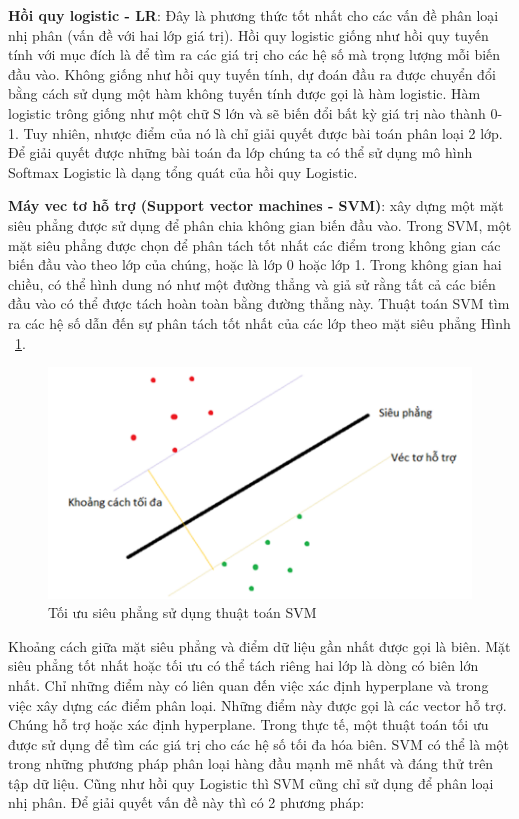 \textbf{Hồi quy logistic - LR}: Đây là phương thức tốt nhất cho các vấn đề phân loại nhị phân (vấn đề với hai lớp giá trị). Hồi quy logistic giống như hồi quy tuyến tính với mục đích là để tìm ra các giá trị cho các hệ số mà trọng lượng mỗi biến đầu vào. Không giống như hồi quy tuyến tính, dự đoán đầu ra được chuyển đổi bằng cách sử dụng một hàm không tuyến tính được gọi là hàm logistic. Hàm logistic trông giống như một chữ S lớn và sẽ biến đổi bất kỳ giá trị nào thành 0-1. Tuy nhiên, nhược điểm của nó là chỉ giải quyết được bài toán phân loại 2 lớp. Để giải quyết được những bài toán đa lớp chúng ta có thể sử dụng mô hình Softmax Logistic là dạng tổng quát của hồi quy Logistic.

\textbf{Máy vec tơ hỗ trợ (Support vector machines - SVM)}: xây dựng một mặt siêu phẳng được sử dụng để phân chia không gian biến đầu vào. Trong SVM, một mặt siêu phẳng được chọn để phân tách tốt nhất các điểm trong không gian các biến đầu vào theo lớp của chúng, hoặc là lớp 0 hoặc lớp 1. Trong không gian hai chiều, có thể hình dung nó như một đường thẳng và giả sử rằng tất cả các biến đầu vào có thể được tách hoàn toàn bằng đường thẳng này. Thuật toán SVM tìm ra các hệ số dẫn đến sự phân tách tốt nhất của các lớp theo mặt siêu phẳng Hình ~\ref{svm}.


\begin{figure}
    \centering
    \includegraphics[width=1\linewidth]{images/svm.png}
    \caption{Tối ưu siêu phẳng sử dụng thuật toán SVM}
    \label{svm}
\end{figure}
Khoảng cách giữa mặt siêu phẳng và điểm dữ liệu gần nhất được gọi là biên. Mặt siêu phẳng tốt nhất hoặc tối ưu có thể tách riêng hai lớp là dòng có biên lớn nhất. Chỉ những điểm này có liên quan đến việc xác định hyperplane và trong việc xây dựng các điểm phân loại. Những điểm này được gọi là các vector hỗ trợ. Chúng hỗ trợ hoặc xác định hyperplane. Trong thực tế, một thuật toán tối ưu được sử dụng để tìm các giá trị cho các hệ số tối đa hóa biên. SVM có thể là một trong những phương pháp phân loại hàng đầu mạnh mẽ nhất và đáng thử trên tập dữ liệu. Cũng như hồi quy Logistic thì SVM cũng chỉ sử dụng để phân loại nhị phân. Để giải quyết vấn đề này thì có 2 phương pháp:

